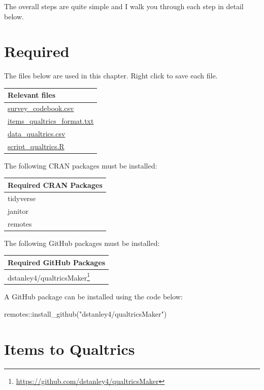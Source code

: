 \documentclass[
]{krantz}
\makeatletter
\newenvironment{Shaded}{\begin{snugshade}}{\end{snugshade}}
\newcommand{\FunctionTok}[1]{\textcolor[rgb]{0,0,0}{#1}}
\newcommand{\NormalTok}[1]{#1}
\newcommand{\SpecialCharTok}[1]{\textcolor[rgb]{0,0,0}{#1}}
\newcommand{\StringTok}[1]{\textcolor[rgb]{0.5,0.5,0.5}{#1}}
\renewcommand{\href}[2]{#2\footnote{\url{#1}}}
\newenvironment{kframe}{%
\medskip{}
\setlength{\fboxsep}{.8em}
 \def\at@end@of@kframe{}%
 \ifinner\ifhmode%
  \def\at@end@of@kframe{\end{minipage}}%
  \begin{minipage}{\columnwidth}%
 \fi\fi%
 \def\FrameCommand##1{\hskip\@totalleftmargin \hskip-\fboxsep
 \colorbox{shadecolor}{##1}\hskip-\fboxsep
     \hskip-\linewidth \hskip-\@totalleftmargin \hskip\columnwidth}%
 \MakeFramed {\advance\hsize-\width
   \@totalleftmargin\z@ \linewidth\hsize
   \@setminipage}}%
 {\par\unskip\endMakeFramed%
 \at@end@of@kframe}
\renewenvironment{Shaded}{\begin{kframe}}{\end{kframe}}
\makeatother
\begin{document}
The overall steps are quite simple and I walk you through each step in detail below.

\hypertarget{required-2}{%
\section{Required}\label{required-2}}

The files below are used in this chapter. Right click to save each file.

\begin{longtable}[]{@{}l@{}}
\toprule
Relevant files \\
\midrule
\endhead
\url{survey_codebook.csv} \\
\url{items_qualtrics_format.txt} \\
\url{data_qualtrics.csv} \\
\url{script_qualtrics.R} \\
\bottomrule
\end{longtable}

The following CRAN packages must be installed:

\begin{longtable}[]{@{}l@{}}
\toprule
Required CRAN Packages \\
\midrule
\endhead
tidyverse \\
janitor \\
remotes \\
\bottomrule
\end{longtable}

The following GitHub packages must be installed:

\begin{longtable}[]{@{}l@{}}
\toprule
Required GitHub Packages \\
\midrule
\endhead
\href{https://github.com/dstanley4/qualtricsMaker}{dstanley4/qualtricsMaker} \\
\bottomrule
\end{longtable}

A GitHub package can be installed using the code below:

\begin{Shaded}
\begin{Highlighting}[]
\NormalTok{remotes}\SpecialCharTok{::}\FunctionTok{install\_github}\NormalTok{(}\StringTok{"dstanley4/qualtricsMaker"}\NormalTok{)}
\end{Highlighting}
\end{Shaded}

\hypertarget{items-to-qualtrics}{%
\section{Items to Qualtrics}\label{items-to-qualtrics}}
\end{document}
